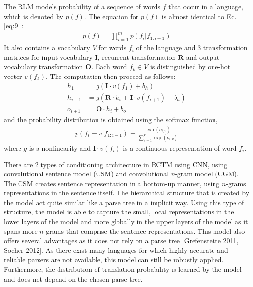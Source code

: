 \documentclass[12pt]{extarticle}
\begin{document}
The RLM models probability of a sequence of words $f$ that occur in a language, which is denoted by $p(f)$. The equation for $p(f)$ is almost identical to Eq. \ref{eq:9} :
\begin{align}
p(f) = \prod_{i=1}^{m} p(f_{i}|f_{1:i-1})
\end{align}
It also contains a vocabulary $V$ for words $f_{i}$ of the language and 3 transformation matrices for input vocabulary $\textbf{I}$, recurrent transformation $\textbf{R}$ and output vocabulary transformation $\textbf{O}$. Each word $f_{k} \in V$ is distinguished by one-hot vector $v(f_{k})$. The computation then proceed as follows: 
\begin{align}
h_{1} &= g(\textbf{I} \cdot v(f_{1}) + b_{h}) \\
h_{i+1} &= g(\textbf{R} \cdot h_{i} + \textbf{I} \cdot v(f_{i+1}) + b_{h}) \\
o_{i+1} &= \textbf{O} \cdot h_{i} + b_{o}
\end{align}
and the probability distribution is obtained using the softmax function, 
\begin{align}
p(f_{i} = v | f_{1:i-1}) = \frac{\exp(o_{i,v})}{\sum_{v=1}^{V}\exp(o_{i,v})}
\end{align}
where $g$ is a nonlinearity and $\textbf{I} \cdot v(f_{i})$ is a continuous representation of word $f_{i}$.

There are 2 types of conditioning architecture in RCTM using CNN, using convolutional sentence model (CSM) and convolutional $n$-gram model (CGM). The CSM creates sentence representation in a bottom-up manner, using $n$-grams representations in the sentence itself. The hierarchical structure that is created by the model act quite similar like a parse tree in a implicit way. Using this type of structure, the model is able to capture the small, local representations in the lower layers of the model and more globally in the upper layers of the model as it spans more $n$-grams that comprise the sentence representations. This model also offers several advantages as it does not rely on a parse tree [Grefenstette 2011, Socher 2012]. As there exist many languages for which highly accurate and reliable parsers are not available, this model can still be robustly applied. Furthermore, the distribution of translation probability is learned by the model and does not depend on the chosen parse tree.
\end{document}
